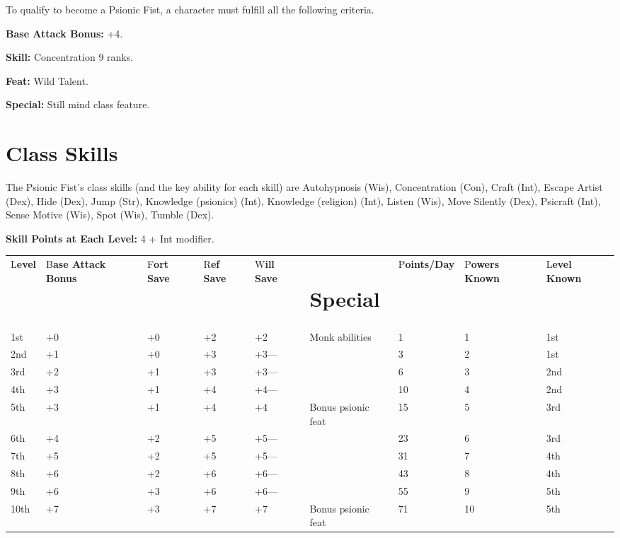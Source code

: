 \documentclass{article}
\begin{document}
To qualify to become a Psionic Fist, a character must fulfill all the following 
criteria.

\textbf{Base Attack Bonus:} +4.

\textbf{Skill:} Concentration 9 ranks.

\textbf{Feat:} Wild Talent.

\textbf{Special:} Still mind class feature.

\vspace{12pt}
\section*{\textbf{Class Skills}}

The Psionic Fist's class skills (and the key ability for each skill) are Autohypnosis 
(Wis), Concentration (Con), Craft (Int), Escape Artist (Dex), Hide (Dex), Jump 
(Str), Knowledge (psionics) (Int), Knowledge (religion) (Int), Listen (Wis), Move 
Silently (Dex), Psicraft (Int), Sense Motive (Wis), Spot (Wis), Tumble (Dex).

\textbf{Skill Points at Each Level:} 4 + Int modifier.

\vspace{12pt}
\begin{tabular}{|>{\raggedright}p{21pt}|>{\raggedright}p{38pt}|>{\raggedright}p{14pt}|>{\raggedright}p{17pt}|>{\raggedright}p{17pt}|>{\raggedright}p{58pt}|>{\raggedright}p{22pt}|>{\raggedright}p{26pt}|>{\raggedright}p{26pt}|}
\hline
\multicolumn{9}{|p{242pt}|}{\section*{T\textbf{able: The Psionic Fist}}}\tabularnewline
\hline
L\textbf{evel} & B\textbf{ase Attack Bonus} & F\textbf{ort Save} & R\textbf{ef 
Save} & W\textbf{ill Save} & \section*{S\textbf{pecial}} & P\textbf{oints/Day} & P\textbf{owers 
Known} & L\textbf{evel Known}\tabularnewline
\hline
1st & +0 & +0 & +2 & +2 & Monk abilities & 1 & 1 & 1st\tabularnewline
\hline
2nd & +1 & +0 & +3 & +3--- &  & 3 & 2 & 1st\tabularnewline
\hline
3rd & +2 & +1 & +3 & +3--- &  & 6 & 3 & 2nd\tabularnewline
\hline
4th & +3 & +1 & +4 & +4--- &  & 10 & 4 & 2nd\tabularnewline
\hline
5th & +3 & +1 & +4 & +4 & Bonus psionic feat & 15 & 5 & 3rd\tabularnewline
\hline
6th & +4 & +2 & +5 & +5--- &  & 23 & 6 & 3rd\tabularnewline
\hline
7th & +5 & +2 & +5 & +5--- &  & 31 & 7 & 4th\tabularnewline
\hline
8th & +6 & +2 & +6 & +6--- &  & 43 & 8 & 4th\tabularnewline
\hline
9th & +6 & +3 & +6 & +6--- &  & 55 & 9 & 5th\tabularnewline
\hline
10th & +7 & +3 & +7 & +7 & Bonus psionic feat & 71 & 10 & 5th\tabularnewline
\hline
\end{tabular}
\end{document}
